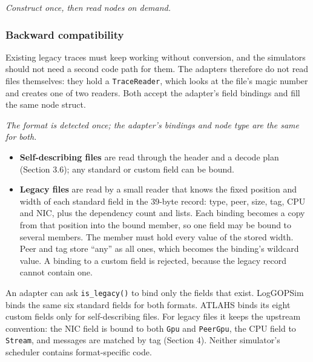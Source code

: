 \documentclass[10pt,a4paper]{article}
\begin{document}
\begin{center}
\resizebox{\linewidth}{!}{}
\par\nopagebreak\small\itshape Construct once, then read nodes on demand.
\end{center}

\hypertarget{backward-compatibility}{}
\subsubsection{Backward compatibility}

Existing legacy traces must keep working without conversion, and the simulators should not need a second code path for them. The adapters therefore do not read files themselves: they hold a \texttt{TraceReader}, which looks at the file's magic number and creates one of two readers. Both accept the adapter's field bindings and fill the same node struct.

\begin{center}
\resizebox{\linewidth}{!}{}
\par\nopagebreak\small\itshape The format is detected once; the adapter's bindings and node type are the same for both.
\end{center}

\begin{itemize}
\item \textbf{Self-describing files} are read through the header and a decode plan (Section 3.6); any standard or custom field can be bound.
\item \textbf{Legacy files} are read by a small reader that knows the fixed position and width of each standard field in the 39-byte record: type, peer, size, tag, CPU and NIC, plus the dependency count and lists. Each binding becomes a copy from that position into the bound member, so one field may be bound to several members. The member must hold every value of the stored width. Peer and tag store ``any'' as all ones, which becomes the binding's wildcard value. A binding to a custom field is rejected, because the legacy record cannot contain one.
\end{itemize}

An adapter can ask \texttt{is\_\allowbreak{}legacy()} to bind only the fields that exist. LogGOPSim binds the same six standard fields for both formats. ATLAHS binds its eight custom fields only for self-describing files. For legacy files it keeps the upstream convention: the NIC field is bound to both \texttt{Gpu} and \texttt{PeerGpu}, the CPU field to \texttt{Stream}, and messages are matched by tag (Section 4). Neither simulator's scheduler contains format-specific code.
\end{document}
